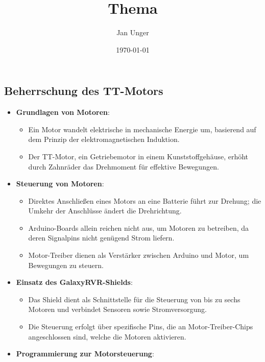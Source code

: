 \documentclass{vorlage-design-main}
\title{Thema}
\author{Jan Unger}
\date{\today}
\begin{document}
\maketitle

\begin{abstract}

\end{abstract}

\hypertarget{beherrschung-des-tt-motors}{%
\subsection{Beherrschung des
TT-Motors}\label{beherrschung-des-tt-motors}}

\begin{itemize}

\item
  \textbf{Grundlagen von Motoren}:

  \begin{itemize}
  
  \item
    Ein Motor wandelt elektrische in mechanische Energie um, basierend
    auf dem Prinzip der elektromagnetischen Induktion.
  \item
    Der TT-Motor, ein Getriebemotor in einem Kunststoffgehäuse, erhöht
    durch Zahnräder das Drehmoment für effektive Bewegungen.
  \end{itemize}
\item
  \textbf{Steuerung von Motoren}:

  \begin{itemize}
  
  \item
    Direktes Anschließen eines Motors an eine Batterie führt zur
    Drehung; die Umkehr der Anschlüsse ändert die Drehrichtung.
  \item
    Arduino-Boards allein reichen nicht aus, um Motoren zu betreiben, da
    deren Signalpins nicht genügend Strom liefern.
  \item
    Motor-Treiber dienen als Verstärker zwischen Arduino und Motor, um
    Bewegungen zu steuern.
  \end{itemize}
\item
  \textbf{Einsatz des GalaxyRVR-Shields}:

  \begin{itemize}
  
  \item
    Das Shield dient als Schnittstelle für die Steuerung von bis zu
    sechs Motoren und verbindet Sensoren sowie Stromversorgung.
  \item
    Die Steuerung erfolgt über spezifische Pins, die an
    Motor-Treiber-Chips angeschlossen sind, welche die Motoren
    aktivieren.
  \end{itemize}
\item
  \textbf{Programmierung zur Motorsteuerung}:


\end{itemize}
\end{document}
